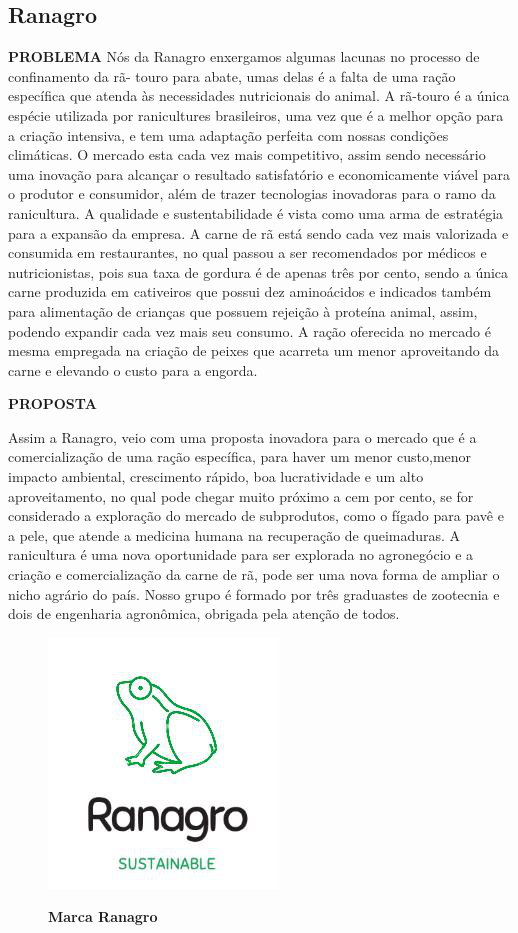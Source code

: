 \subsection{Ranagro}

\textbf{PROBLEMA}
Nós da Ranagro enxergamos algumas lacunas no processo de confinamento da rã- touro para abate, umas delas é a falta de uma ração específica que atenda às necessidades nutricionais do animal. A rã-touro é a única espécie utilizada por ranicultures brasileiros, uma vez que é a melhor opção para a criação intensiva, e tem uma adaptação perfeita com nossas condições climáticas. O mercado esta cada vez mais competitivo, assim sendo necessário uma inovação para alcançar o resultado satisfatório e economicamente viável para o produtor e consumidor, além de trazer tecnologias inovadoras para o ramo da ranicultura. A qualidade e sustentabilidade é vista como uma arma de estratégia para a expansão da empresa. A carne de rã está sendo cada vez mais valorizada e consumida em restaurantes, no qual passou a ser recomendados por médicos e nutricionistas, pois sua taxa de gordura é de apenas três por cento, sendo a única carne produzida em cativeiros que possui dez aminoácidos e indicados também para alimentação de crianças que possuem rejeição à proteína animal, assim, podendo expandir cada vez mais seu consumo. A ração oferecida no mercado é mesma empregada na criação de peixes que acarreta um menor aproveitando da carne e elevando o custo para a engorda.

\textbf{PROPOSTA}

Assim a Ranagro, veio com uma proposta inovadora para o mercado que é a comercialização de uma ração específica, para haver um menor custo,menor impacto ambiental, crescimento rápido, boa lucratividade e um alto aproveitamento, no qual pode chegar muito próximo a cem por cento, se for considerado a exploração do mercado de subprodutos, como o fígado para pavê e a pele, que atende a medicina humana na recuperação de queimaduras. A ranicultura é uma nova oportunidade para ser explorada no agronegócio e a criação e comercialização da carne de rã, pode ser uma nova forma de ampliar o nicho agrário do país. Nosso grupo é formado por três graduastes de zootecnia e dois de engenharia agronômica, obrigada pela atenção de todos.



\begin{figure}[!htb]
\centering
\caption{\textbf{Marca Ranagro}}
\includegraphics[scale=0.7]{Imagens/ranagro.png}
\label{figura_26}
\end{figure}
\newpage



